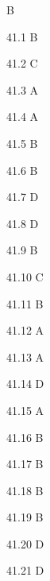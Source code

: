 \begin{Solution}{41}
B
\end{Solution}
\begin{Solution}{41.{1}}
B
\end{Solution}
\begin{Solution}{41.{2}}
C
\end{Solution}
\begin{Solution}{41.{3}}
A
\end{Solution}
\begin{Solution}{41.{4}}
A
\end{Solution}
\begin{Solution}{41.{5}}
B
\end{Solution}
\begin{Solution}{41.{6}}
B
\end{Solution}
\begin{Solution}{41.{7}}
D
\end{Solution}
\begin{Solution}{41.{8}}
D
\end{Solution}
\begin{Solution}{41.{9}}
B
\end{Solution}
\begin{Solution}{41.{10}}
C
\end{Solution}
\begin{Solution}{41.{11}}
B
\end{Solution}
\begin{Solution}{41.{12}}
A
\end{Solution}
\begin{Solution}{41.{13}}
A
\end{Solution}
\begin{Solution}{41.{14}}
D
\end{Solution}
\begin{Solution}{41.{15}}
A
\end{Solution}
\begin{Solution}{41.{16}}
B
\end{Solution}
\begin{Solution}{41.{17}}
B
\end{Solution}
\begin{Solution}{41.{18}}
B
\end{Solution}
\begin{Solution}{41.{19}}
B
\end{Solution}
\begin{Solution}{41.{20}}
D
\end{Solution}
\begin{Solution}{41.{21}}
D
\end{Solution}
